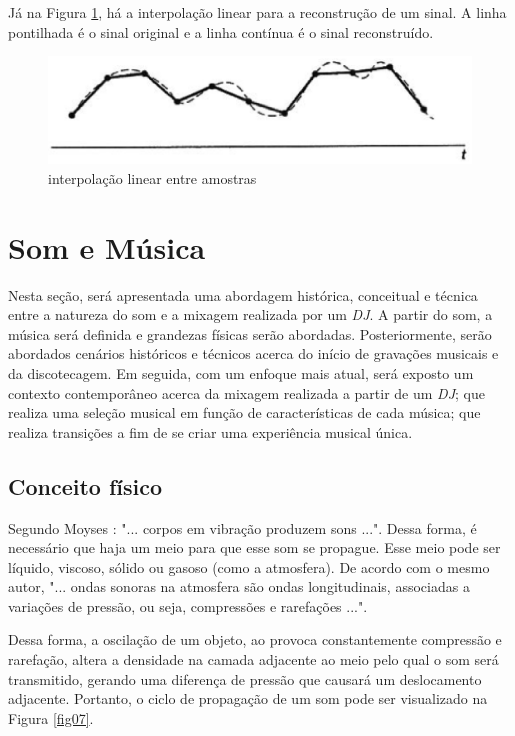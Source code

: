 Já na Figura \ref{fig06}, há a interpolação linear para a reconstrução de um sinal. A linha pontilhada é o sinal original e a linha contínua é o sinal reconstruído. 

\begin{figure}[h]
	\centering
    \includegraphics[scale=0.4]{figuras/fig06.eps}
	\caption{interpolação linear entre amostras}
	\label{fig06}
\end{figure}


\section{Som e Música}
Nesta seção, será apresentada uma abordagem histórica, conceitual e técnica entre a natureza do som e a mixagem realizada por um \textit{DJ}. A partir do som, a música será definida e grandezas físicas serão abordadas. Posteriormente, serão abordados cenários históricos e técnicos acerca do início de gravações musicais e da discotecagem. Em seguida, com um enfoque mais atual, será exposto um contexto contemporâneo acerca da mixagem realizada a partir de um \textit{DJ}; que realiza uma seleção musical em função de características de cada música; que realiza transições a fim de se criar uma experiência musical única.

\subsection{Conceito físico}
Segundo Moyses \cite{moyses}: "... corpos em vibração produzem sons ...". Dessa forma, é necessário que haja um meio para que esse som se propague. Esse meio pode ser líquido, viscoso, sólido ou gasoso (como a atmosfera). De acordo com o mesmo autor, "... ondas sonoras na atmosfera são ondas longitudinais, associadas a variações de pressão, ou seja, compressões e rarefações ...". \par Dessa forma, a oscilação de um objeto, ao provoca constantemente compressão e rarefação, altera a densidade na camada adjacente ao meio pelo qual o som será transmitido, gerando uma diferença de pressão que causará um deslocamento adjacente. Portanto, o ciclo de propagação de um som pode ser visualizado na Figura \ref{fig07}.

